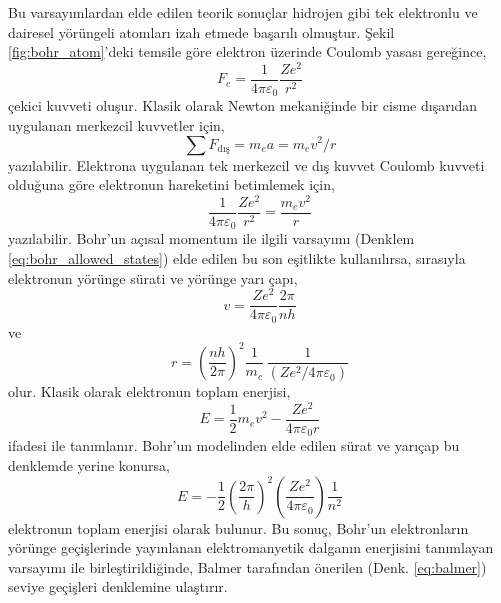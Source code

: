 \documentclass[a4paper,12pt, twoside]{article}
\begin{document}
Bu varsayımlardan elde edilen teorik sonuçlar hidrojen gibi tek elektronlu ve dairesel yörüngeli atomları izah etmede başarılı olmuştur. Şekil \ref{fig:bohr_atom}'deki temsile göre elektron üzerinde Coulomb yasası gereğince,
\begin{equation}
F_e = \frac{1}{4\pi\varepsilon_0} \frac{Ze^2}{r^2}
\label{eq:bohr_elektron}
\end{equation}
çekici kuvveti oluşur. Klasik olarak Newton mekaniğinde bir cisme dışarıdan uygulanan merkezcil kuvvetler için,
\begin{equation}
\sum F_\text{dış} = m_e a = m_e v^2/r
\label{eq:newton_ma}
\end{equation}
yazılabilir. Elektrona uygulanan tek merkezcil ve dış kuvvet Coulomb kuvveti olduğuna göre elektronun hareketini betimlemek için,
\begin{equation}
\frac{1}{4\pi\varepsilon_0} \frac{Ze^2}{r^2} = \frac{m_e v^2}{r} 
\label{eq:bohr_orbit_motion}
\end{equation}
yazılabilir. Bohr'un açısal momentum ile ilgili varsayımı (Denklem \ref{eq:bohr_allowed_states}) elde edilen bu son eşitlikte kullanılırsa, sırasıyla elektronun yörünge sürati ve yörünge yarı çapı,
\begin{equation}
v = \frac{Ze^2}{4\pi\varepsilon_0}  \frac{2\pi}{n h}
\label{eq:bohr_elektron_speed}
\end{equation}
ve
\begin{equation}
r = \left(\frac{n h}{2 \pi} \right)^2 \frac{1}{m_e}\, \frac{1}{(Z e^2/4\pi\varepsilon_0)}
\label{eq:bohr_elektron_radius}
\end{equation}
olur. Klasik olarak elektronun toplam enerjisi,
\begin{equation}
E = \frac{1}{2}m_e v^2 - \frac{Z e^2}{4\pi\varepsilon_0 r}
\label{eq:bohr_elektron_energy1}
\end{equation}
ifadesi ile tanımlanır. Bohr'un modelinden elde edilen sürat ve yarıçap bu denklemde yerine konursa,
\begin{equation}
E = -\frac{1}{2} \left(\frac{2\pi}{h} \right)^2 \left(\frac{Ze^2}{4\pi \varepsilon_0} \right) \frac{1}{n^2}
\label{eq:bohr_elektron_energy2}
\end{equation}
elektronun toplam enerjisi olarak bulunur. Bu sonuç, Bohr'un elektronların yörünge geçişlerinde yayınlanan elektromanyetik dalganın enerjisini tanımlayan varsayımı ile birleştirildiğinde, Balmer tarafından önerilen (Denk. \ref{eq:balmer}) seviye geçişleri denklemine ulaştırır.
\end{document}
